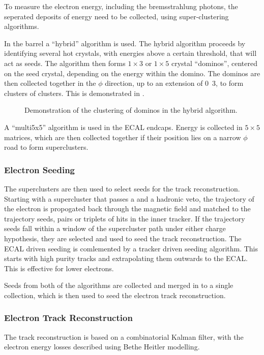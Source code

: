 To measure the electron energy, including the bremsstrahlung photons, the
seperated deposits of energy need to be collected, using super-clustering
algorithms. 

In the barrel a ``hybrid'' algorithm is used. The hybrid algorithm proceeds by
identifying several hot crystals, with energies above a certain threshold, that
will act as seeds. The algorithm then forms $1\times3$ or $1\times5$ crystal
``dominos'', centered on the seed crystal, depending on the energy within the
domino. The dominos are then collected together in the $\phi$ direction, up to
an extension of \unit{0.3}{\rad}, to form clusters of clusters. This is
demonstrated in .

\begin{figure}[htb]
  \centering
  \caption{Demonstration of the clustering of dominos in the hybrid algorithm.}
  \label{reco:hybrid}
\end{figure}

A ``multi5x5'' algorithm is used in the ECAL endcaps. Energy is collected in
$5\times5$ matrices, which are then collected together if their position lies on
a narrow $\phi$ road to form superclusters.

\subsubsection{Electron Seeding}
The superclusters are then used to select seeds for the track reconstruction.
Starting with a supercluster that passes a \pt and a hadronic veto, the
trajectory of the electron is propogated back through the magnetic field and
matched to the trajectory seeds, pairs or triplets of hits in the inner tracker.
If the trajectory seeds fall within a window of the supercluster path under
either charge hypothesis, they are selected and used to seed the track
reconstruction.
The ECAL driven seeding is comlemented by a tracker driven seeding algorithm.
This starts with high purity tracks and extrapolating them outwards to the ECAL.
This is effective for lower \pt electrons.

Seeds from both of the algorithms are collected and merged in to a single
collection, which is then used to seed the electron track reconstruction.

\subsubsection{Electron Track Reconstruction}
The track reconstruction is based on a combinatorial Kalman filter, with the electron energy losses described using Bethe Heitler
modelling.


